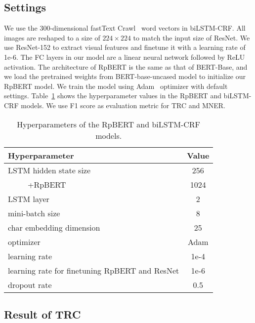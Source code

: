 \documentclass[letterpaper]{article} \usepackage{aaai21}  \usepackage{times}  \usepackage{helvet} \usepackage{courier}  \usepackage[hyphens]{url}  \usepackage{graphicx} \urlstyle{rm} \def\UrlFont{\rm}  \usepackage{natbib}  \usepackage{caption} \frenchspacing  \setlength{\pdfpagewidth}{8.5in}  \setlength{\pdfpageheight}{11in}
\begin{document}
\subsection{Settings}

We use the 300-dimensional fastText Crawl~\cite{mikolov2018advances} word vectors in biLSTM-CRF.
All images are reshaped to a size of $224 \times 224$ to match the input size of ResNet.
We use ResNet-152 to extract visual features and finetune it with a learning rate of 1e-6.
The FC layers in our model are a linear neural network followed by ReLU activation.
The architecture of  RpBERT is the same as  that of BERT-Base, and  we load the pretrained weights from BERT-base-uncased model  to initialize our RpBERT model.
We train the model using Adam~\cite{kingma2014adam} optimizer with default settings. 
Table~\ref{tab:parameters} shows the hyperparameter values in the RpBERT and biLSTM-CRF models.
We use F1 score as evaluation metric for TRC and MNER.








\begin{table}[htb]

\begin{center}
\small
\begin{tabular}{|l|c|}

\hline
Hyperparameter & Value\\
\hline
LSTM hidden state size  &256\\
~~~~~+RpBERT& 1024\\
LSTM layer  & 2\\
mini-batch size&8\\
char embedding dimension & 25\\
optimizer& Adam\\
learning rate & 1e-4\\  learning rate for finetuning RpBERT and ResNet& 1e-6\\  dropout rate  & 0.5\\
\hline
\end{tabular}
\end{center}
\caption{Hyperparameters of the RpBERT and biLSTM-CRF models.}\label{tab:parameters}
\end{table}




\subsection{Result of TRC}
\end{document}
